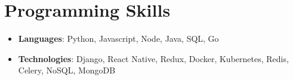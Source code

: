 \documentclass[letterpaper,11pt]{article}
\newcommand{\resumeSubHeadingListStart}{\begin{itemize}[leftmargin=*]}
\newcommand{\resumeSubHeadingListEnd}{\end{itemize}}
\begin{document}
  \section{Programming Skills}
    \resumeSubHeadingListStart
      \item{
        \textbf{Languages}{: Python, Javascript, Node, Java, SQL, Go}
      }
      \item{
        \textbf{Technologies}{: Django, React Native, Redux, Docker, Kubernetes, Redis, Celery, NoSQL, MongoDB}
      }
    \resumeSubHeadingListEnd
  
  
  
\end{document}
